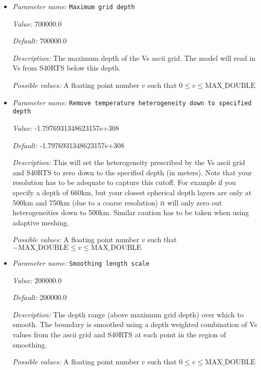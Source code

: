 \begin{itemize}
\item {\it Parameter name:} {\tt Maximum grid depth}
\label{parameters:Initial temperature model/Patch on S40RTS/Maximum grid depth}
\label{parameters:Initial_20temperature_20model/Patch_20on_20S40RTS/Maximum_20grid_20depth}


{\it Value:} 700000.0


{\it Default:} 700000.0


{\it Description:} The maximum depth of the Vs ascii grid. The model will read in  Vs from S40RTS below this depth.


{\it Possible values:} A floating point number $v$ such that $0 \leq v \leq \text{MAX\_DOUBLE}$
\item {\it Parameter name:} {\tt Remove temperature heterogeneity down to specified depth}
\label{parameters:Initial temperature model/Patch on S40RTS/Remove temperature heterogeneity down to specified depth}
\label{parameters:Initial_20temperature_20model/Patch_20on_20S40RTS/Remove_20temperature_20heterogeneity_20down_20to_20specified_20depth}


{\it Value:} -1.7976931348623157e+308


{\it Default:} -1.7976931348623157e+308


{\it Description:} This will set the heterogeneity prescribed by the Vs ascii grid and S40RTS to zero down to the specified depth (in meters). Note that your resolution has to be adequate to capture this cutoff. For example if you specify a depth of 660km, but your closest spherical depth layers are only at 500km and 750km (due to a coarse resolution) it will only zero out heterogeneities down to 500km. Similar caution has to be taken when using adaptive meshing.


{\it Possible values:} A floating point number $v$ such that $-\text{MAX\_DOUBLE} \leq v \leq \text{MAX\_DOUBLE}$
\item {\it Parameter name:} {\tt Smoothing length scale}
\label{parameters:Initial temperature model/Patch on S40RTS/Smoothing length scale}
\label{parameters:Initial_20temperature_20model/Patch_20on_20S40RTS/Smoothing_20length_20scale}


{\it Value:} 200000.0


{\it Default:} 200000.0


{\it Description:} The depth range (above maximum grid depth) over which to smooth. The boundary is smoothed using a depth weighted combination of Vs values from the ascii grid and S40RTS at each point in the region of smoothing.


{\it Possible values:} A floating point number $v$ such that $0 \leq v \leq \text{MAX\_DOUBLE}$
\end{itemize}
